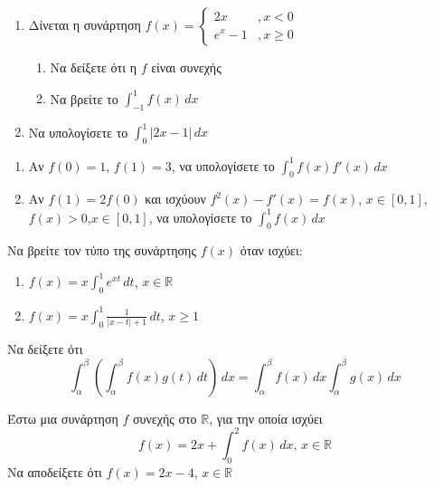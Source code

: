 \documentclass{../presentation}
\begin{document}
\begin{askisi}
  \begin{enumerate}[<+->]
    \item Δίνεται η συνάρτηση $f(x)=\begin{cases}
              2x    & ,  x<0   \\
              e^x-1 & ,  x\ge0
            \end{cases}$
          \begin{enumerate}[<+->]
            \item Να δείξετε ότι η $f$ είναι συνεχής
            \item Να βρείτε το $\int_{-1}^{1}f(x)\, dx$
          \end{enumerate}
    \item Να υπολογίσετε το $\int_{0}^{1}|2x-1|\, dx$
  \end{enumerate}
\end{askisi}

\begin{askisi}
  \begin{enumerate}[<+->]
    \item Αν $f(0)=1$, $f(1)=3$, να υπολογίσετε το $\int_{0}^{1}f(x)f'(x)\, dx$
    \item Αν $f(1)=2f(0)$ και ισχύουν $f^2(x)-f'(x)=f(x)$, $x\in [0,1]$, $f(x)>0$,$x\in [0,1]$, να υπολογίσετε το $\int_{0}^{1}f(x)\, dx$
  \end{enumerate}
\end{askisi}

\begin{askisi}
  Να βρείτε τον τύπο της συνάρτησης $f(x)$ όταν ισχύει:
  \begin{enumerate}[<+->]
    \item $f(x)=x\int_{0}^{1}e^{xt}\, dt$, $x\in\mathbb{R}$
    \item $f(x)=x\int_{0}^{1}\frac{1}{|x-t|+1}\, dt$, $x\ge 1$
  \end{enumerate}
\end{askisi}

\begin{askisi}
  Να δείξετε ότι $$\int_{α}^{β}\left( \int_{α}^{β}f(x)g(t) \, dt \right) \, dx=\int_{α}^{β}f(x) \, dx\int_{α}^{β}g(x) \, dx$$
\end{askisi}

\begin{askisi}
  Έστω μια συνάρτηση $f$ συνεχής στο $\mathbb{R}$, για την οποία ισχύει
  $$f(x)=2x+\int_{0}^{2}f(x) \, dx \text{, } x\in\mathbb{R}$$
  Να αποδείξετε ότι $f(x)=2x-4$, $x\in\mathbb{R}$
\end{askisi}
\end{document}
